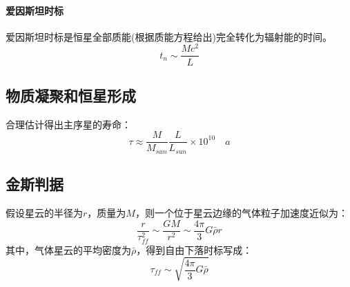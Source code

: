 \paragraph{爱因斯坦时标}爱因斯坦时标是恒星全部质能(根据质能方程给出)完全转化为辐射能的时间。
\begin{equation}
	t_{n}\sim\frac{Mc^2}{L}
\end{equation}
\subsection{物质凝聚和恒星形成}
合理估计得出主序星的寿命：
\begin{equation}
	\tau\approx\frac{M}{M_{sun}}\frac{L}{L_{sun}}\times 10^10 \quad a
\end{equation}

\subsection{金斯判据}
假设星云的半径为$r$，质量为$M$，则一个位于星云边缘的气体粒子加速度近似为：
\begin{equation}
	\frac{r}{\tau_{ff}^2}\sim\frac{GM}{r^2}\sim\frac{4\pi}{3}G\bar{\rho}r
\end{equation}
其中，气体星云的平均密度为$\bar{\rho}$，得到自由下落时标写成：
\begin{equation}
	\tau_{ff}\sim\sqrt{\frac{4\pi}{3}G\bar{\rho}}
\end{equation}
